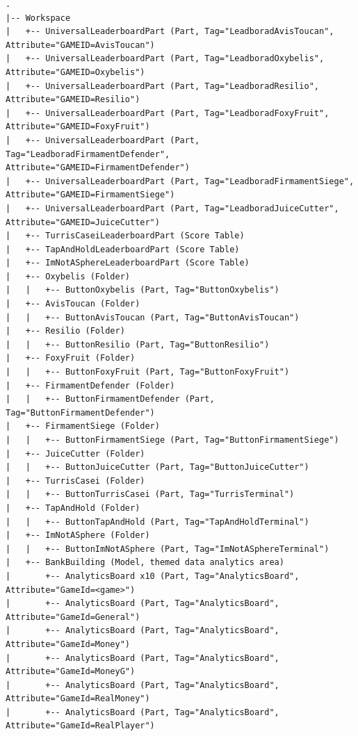\documentclass[12pt,letterpaper]{article}
\begin{document}
\begin{lstlisting}[caption={Current project structure in Roblox (Updated with Avis Toucan, Oxybelis, Resilio, Foxy Fruit, Firmament Defender, Firmament Siege, Juice Cutter, Universal Leaderboard, and the Data Analytics System).},label={lst:roblox-structure-final}]
.
|-- Workspace
|   +-- UniversalLeaderboardPart (Part, Tag="LeadboradAvisToucan", Attribute="GAMEID=AvisToucan")
|   +-- UniversalLeaderboardPart (Part, Tag="LeadboradOxybelis", Attribute="GAMEID=Oxybelis")
|   +-- UniversalLeaderboardPart (Part, Tag="LeadboradResilio", Attribute="GAMEID=Resilio")
|   +-- UniversalLeaderboardPart (Part, Tag="LeadboradFoxyFruit", Attribute="GAMEID=FoxyFruit")
|   +-- UniversalLeaderboardPart (Part, Tag="LeadboradFirmamentDefender", Attribute="GAMEID=FirmamentDefender")
|   +-- UniversalLeaderboardPart (Part, Tag="LeadboradFirmamentSiege", Attribute="GAMEID=FirmamentSiege")
|   +-- UniversalLeaderboardPart (Part, Tag="LeadboradJuiceCutter", Attribute="GAMEID=JuiceCutter")
|   +-- TurrisCaseiLeaderboardPart (Score Table)
|   +-- TapAndHoldLeaderboardPart (Score Table)
|   +-- ImNotASphereLeaderboardPart (Score Table)
|   +-- Oxybelis (Folder)
|   |   +-- ButtonOxybelis (Part, Tag="ButtonOxybelis")
|   +-- AvisToucan (Folder)
|   |   +-- ButtonAvisToucan (Part, Tag="ButtonAvisToucan")
|   +-- Resilio (Folder)
|   |   +-- ButtonResilio (Part, Tag="ButtonResilio")
|   +-- FoxyFruit (Folder)
|   |   +-- ButtonFoxyFruit (Part, Tag="ButtonFoxyFruit")
|   +-- FirmamentDefender (Folder)
|   |   +-- ButtonFirmamentDefender (Part, Tag="ButtonFirmamentDefender")
|   +-- FirmamentSiege (Folder)
|   |   +-- ButtonFirmamentSiege (Part, Tag="ButtonFirmamentSiege")
|   +-- JuiceCutter (Folder)
|   |   +-- ButtonJuiceCutter (Part, Tag="ButtonJuiceCutter")
|   +-- TurrisCasei (Folder)
|   |   +-- ButtonTurrisCasei (Part, Tag="TurrisTerminal")
|   +-- TapAndHold (Folder)
|   |   +-- ButtonTapAndHold (Part, Tag="TapAndHoldTerminal")
|   +-- ImNotASphere (Folder)
|   |   +-- ButtonImNotASphere (Part, Tag="ImNotASphereTerminal")
|   +-- BankBuilding (Model, themed data analytics area)
|       +-- AnalyticsBoard x10 (Part, Tag="AnalyticsBoard", Attribute="GameId=<game>")
|       +-- AnalyticsBoard (Part, Tag="AnalyticsBoard", Attribute="GameId=General")
|       +-- AnalyticsBoard (Part, Tag="AnalyticsBoard", Attribute="GameId=Money")
|       +-- AnalyticsBoard (Part, Tag="AnalyticsBoard", Attribute="GameId=MoneyG")
|       +-- AnalyticsBoard (Part, Tag="AnalyticsBoard", Attribute="GameId=RealMoney")
|       +-- AnalyticsBoard (Part, Tag="AnalyticsBoard", Attribute="GameId=RealPlayer")

\end{lstlisting}
\end{document}
